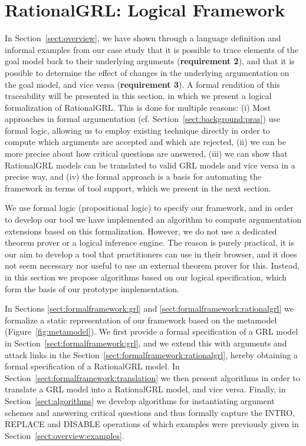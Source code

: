 \section{RationalGRL: Logical Framework}
\label{sect:formalframework}

In Section~\ref{sect:overview}, we have shown through a language definition and informal examples from our case study that it is possible to trace elements of the goal model back to their underlying arguments (\textbf{requirement 2}), and that it is possible to determine the effect of changes in the underlying argumentation on the goal model, and vice versa (\textbf{requirement 3}). A formal rendition of this traceability will be presented in this section, in which we present a logical formalization of RationalGRL. This is done for multiple reasons: (i) Most approaches in formal argumentation (cf. Section~\ref{sect:background:pras}) use formal logic, allowing us to employ existing technique directly in order to compute which arguments are accepted and which are rejected, (ii) we can be more precise about how critical questions are answered, (iii) we can show that RationalGRL models can be translated to valid GRL models and vice versa in a precise way, and (iv) the formal approach is a basis for automating the framework in terms of tool support, which we present in the next section.

We use formal logic (propositional logic) to specify our framework, and in order to develop our tool we have implemented an algorithm to compute argumentation extensions based on this formalization. However, we do not use a dedicated theorem prover or a logical inference engine. The reason is purely practical, it is our aim to develop a tool that practitioners can use in their browser, and it does not seem necessary nor useful to use an external theorem prover for this. Instead, in this section we propose algorithms based on our logical specification, which form the basis of our prototype implementation.

In Sections \ref{sect:formalframework:grl} and \ref{sect:formalframework:rationalgrl} we formalize a static representation of our framework based on the metamodel (Figure~\ref{fig:metamodel}). We first provide a formal specification of a GRL model in Section~\ref{sect:formalframework:grl}, and we extend this with arguments and attack links in the Section~\ref{sect:formalframework:rationalgrl}, hereby obtaining a formal specification of a RationalGRL model. In Section~\ref{sect:formalframework:translation} we then present algorithms in order to translate a GRL model into a RationalGRL model, and vice versa. Finally, in Section~\ref{sect:algorithms} we develop algorithms for instantiating argument schemes and answering critical questions and thus formally capture the \textsf{INTRO}, \textsf{REPLACE} and \textsf{DISABLE} operations of which examples were previously given in Section~\ref{sect:overview:examples}. 

